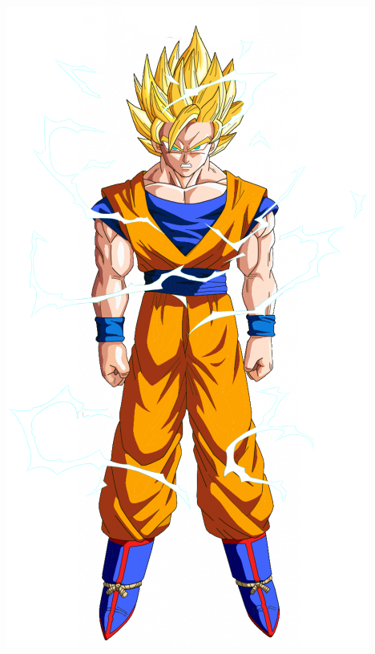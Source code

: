 \begin{frame}
\begin{columns}
    \begin{center}
      \includegraphics[scale=.25]{Pictures/Goku_super_saiyajin_2.png}
    \end{center}
  \end{columns}
\end{frame}

